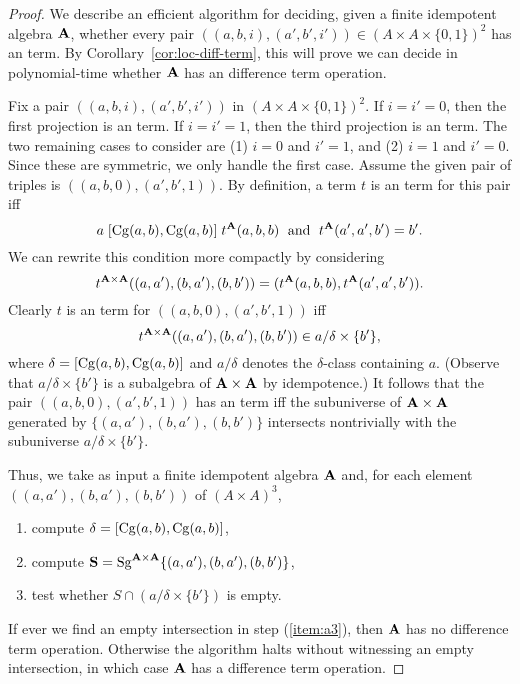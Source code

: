 \begin{proof}
  We describe an efficient algorithm for deciding,
  given a finite idempotent algebra $\mathbf{A}$,
  whether every pair $((a,b,i), (a',b',i')) \in (A\times A \times \{0,1\})^2$ 
  has an \ld term.  By Corollary~\ref{cor:loc-diff-term}, this will prove we
  can decide in polynomial-time whether $\mathbf{A}$ has an difference term operation.

  Fix a pair
  $((a,b,i), (a',b',i'))$ in $(A\times A \times \{0,1\})^2$. If $i = i' = 0$,
  then the first projection is an \ld term. If $i = i' = 1$,
    then the third projection is an \ld term. The two remaining cases to
    consider are (1) $i = 0$ and $i'=1$, and (2)
    $i = 1$ and $i'=0$. Since these are symmetric, we only handle the
    first case. Assume  the given pair of triples is
    $((a,b,0), (a',b',1))$.  By definition, a term $t$ is 
    an \ld term for this pair iff
    \[
    a\mathrel{[\operatorname{Cg}(a,b), \operatorname{Cg}(a,b)]} t^{\mathbf{A}}(a,b,b) \; \text{ and } \;
    t^{\mathbf{A}}(a',a',b') = b'.
    \]
    We can rewrite this condition more compactly by
    considering
    \[t^{\mathbf{A}\times \mathbf{A}}((a,a'), (b,a'), (b,b')) =
    (t^{\mathbf{A}}(a,b,b),t^{\mathbf{A}}(a',a',b')).\]
    Clearly $t$ is an \ld term for
    $((a,b,0), (a',b',1))$ iff
    \[
    t^{\mathbf{A}\times \mathbf{A}}((a,a'), (b,a'), (b,b'))\in a/\delta \times \{b'\},
    \]
    where $\delta = [\operatorname{Cg}(a,b), \operatorname{Cg}(a,b)]$ and $a/\delta$ denotes the
    $\delta$-class containing $a$.
    (Observe that $a/\delta \times \{b'\}$ is a subalgebra of $\mathbf{A} \times \mathbf{A}$
    by idempotence.)
    It follows that the pair
    $((a,b,0), (a',b',1))$ has an \ld term iff
    the subuniverse of $\mathbf{A}\times \mathbf{A}$ generated by
    $\{(a,a'), (b,a'), (b,b')\}$ intersects nontrivially with the subuniverse
    $a/\delta \times \{b'\}$.

    Thus, we take as input a finite idempotent algebra $\mathbf{A}$ and, 
    for each element $((a,a'), (b,a'), (b,b'))$ of $(A\times A)^3$,
    \begin{enumerate}
      \item compute $\delta = [\operatorname{Cg}(a,b), \operatorname{Cg}(a,b)]$, 
      \item compute $\mathbf{S} = \operatorname{Sg}^{\mathbf{A}\times \mathbf{A}}\{(a,a'), (b,a'), (b,b')\}$,
      \item \label{item:a3} test whether $S \cap (a/\delta \times \{b'\})$ is empty.
    \end{enumerate}
    If ever we find an empty intersection in step (\ref{item:a3}), then
    $\mathbf{A}$ has no difference term operation.
    Otherwise the algorithm halts without witnessing an empty
    intersection, in which case $\mathbf{A}$ has a difference term operation.


\end{proof}
